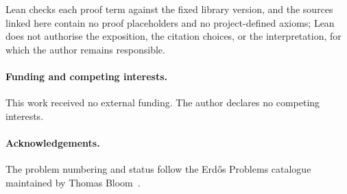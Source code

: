 Lean checks each proof term against the fixed library
version, and the sources linked here contain no proof placeholders and no
project-defined axioms; Lean does not authorise the exposition, the citation
choices, or the interpretation, for which the author remains responsible.

\paragraph{Funding and competing interests.} This work received no external
funding.  The author declares no competing interests.

\paragraph{Acknowledgements.} The problem numbering and status follow the
Erd\H{o}s Problems catalogue maintained by Thomas Bloom~\cite{erdosproblems}.
